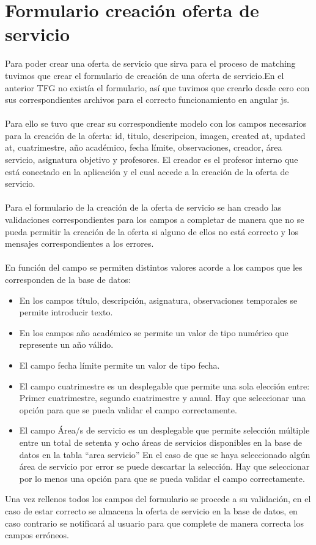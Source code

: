 \documentclass[11pt]{book}
\begin{document}
\section{Formulario creación oferta de servicio}
Para poder crear una oferta de servicio que sirva para el proceso de matching tuvimos que crear el formulario de creación de una oferta de servicio.En el anterior TFG no existía el formulario, así que tuvimos que crearlo desde cero con sus correspondientes archivos para el correcto funcionamiento en angular js.\\\\
Para ello se tuvo que crear su correspondiente modelo con los campos necesarios para la creación de la oferta: id, titulo, descripcion, imagen, created at, updated at, cuatrimestre, año académico, fecha límite, observaciones, creador, área servicio, asignatura objetivo y profesores. El creador es el profesor interno que está conectado en la aplicación y el cual accede a la creación de la oferta de servicio.\\\\
Para el formulario de la creación de la oferta de servicio se han creado las validaciones correspondientes para los campos a completar de manera que no se pueda permitir la creación de la oferta si alguno de ellos no está correcto y los mensajes correspondientes a los errores. \\\\
En función del campo se permiten distintos valores acorde a los campos que les corresponden de la base de datos: \\
\begin{itemize} 
	\item En los campos título, descripción, asignatura, observaciones temporales se permite introducir texto.
	\item En los campos año académico se permite un valor de tipo numérico que represente un año válido.
	\item El campo fecha límite permite un valor de tipo fecha. 
	\item  El campo cuatrimestre es un desplegable que permite una sola elección entre: Primer cuatrimestre, segundo cuatrimestre y anual. Hay que seleccionar una opción para que se pueda validar el campo correctamente.
	\item El campo Área/s de servicio es un desplegable que permite selección múltiple entre un total de setenta y ocho áreas de servicios disponibles en la base de datos en la tabla “area servicio” En el caso de que se haya seleccionado algún área de servicio por error se puede descartar la selección. Hay que seleccionar por lo menos una opción para que se pueda validar el campo correctamente.
\end{itemize}
Una vez rellenos todos los campos del formulario se procede a su validación, en el caso de estar correcto se almacena la oferta de servicio en la base de datos, en caso contrario se notificará al usuario para que complete de manera correcta los campos erróneos.
\end{document}
